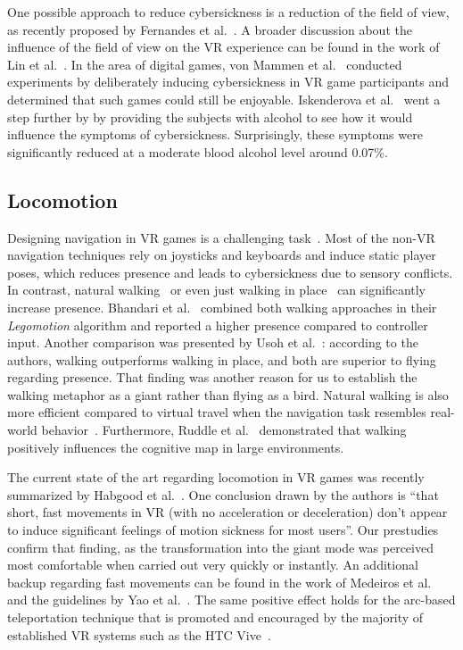 \documentclass{sigchi}
\begin{document}
One possible approach to reduce cybersickness is a reduction of the field of view, as recently proposed by Fernandes et al.~\cite{fernandes2016combating}. A broader discussion about the influence of the field of view on the VR experience can be found in the work of Lin et al.~\cite{lin2002effects}. In the area of digital games, von Mammen et al.~\cite{von2016cyber} conducted experiments by deliberately inducing cybersickness in VR game participants and determined that such games could still be enjoyable. Iskenderova et al.~\cite{iskenderova2017drunk} went a step further by by providing the subjects with alcohol to see how it would influence the symptoms of cybersickness. Surprisingly, these symptoms were significantly reduced at a moderate blood alcohol level around 0.07\%. 




\subsection{Locomotion}

Designing navigation in VR games is a challenging task~\cite{Habgood:2017:HLP:3130859.3131437}. Most of the non-VR navigation techniques rely on joysticks and keyboards and induce static player poses, which reduces  presence and leads to cybersickness due to sensory conflicts. In contrast, natural walking~\cite{ruddle2009benefits} or even just walking in place~\cite{slater1995taking, tregillus2016vr} can significantly increase presence. Bhandari et al.~\cite{Bhandari:2017:LSW:3139131.3139133} combined both walking approaches in their \textit{Legomotion} algorithm and reported a higher presence compared to controller input. Another comparison was presented by Usoh et al.~\cite{usoh1999walking}: according to the authors, walking outperforms walking in place, and both are superior to flying regarding presence. That finding was another reason for us to establish the walking metaphor as a giant rather than flying as a bird. Natural walking is also more efficient compared to virtual travel when the navigation task resembles real-world behavior~\cite{suma2010evaluation}. Furthermore, Ruddle et al.~\cite{ruddle2011walking} demonstrated that walking positively influences the cognitive map in large environments.


The current state of the art regarding locomotion in VR games was recently summarized by Habgood et al.~\cite{Habgood:2017:HLP:3130859.3131437}. One conclusion drawn by the authors is ``that short, fast movements in VR (with no acceleration or deceleration) don't appear to induce significant feelings of motion sickness for most users''. Our prestudies confirm that finding, as the transformation into the giant mode was perceived most comfortable when carried out very quickly or instantly. An additional backup regarding fast movements can be found in the work of Medeiros et al.~\cite{medeiros2016effects} and the guidelines by Yao et al.~\cite{yao2014oculus}. The same positive effect holds for the arc-based teleportation technique that is promoted and encouraged by the majority of established VR systems such as the HTC Vive~\cite{vive}. 
\end{document}
